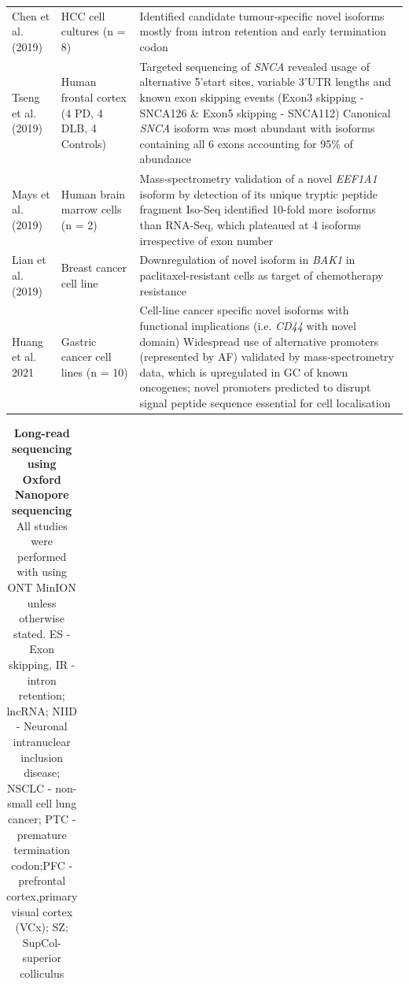 \begin{changemargin}{1.5cm}
\begin{landscape}
\begin{longtable}[c]{p{4cm}p{4cm}p{18cm}}
			\centering Chen et al. (2019) \cite{Chen2019} &
			\centering HCC cell cultures (n = 8)  &
			\tabitem Identified candidate tumour-specific novel isoforms mostly from intron retention and early termination codon\\
			\hdashline[0.5pt/5pt]
			
			\centering Tseng et al. (2019) \cite{Tseng2019} &
			\centering Human frontal cortex \newline (4 PD, 4 DLB, 4 Controls)  &
			\tabitem Targeted sequencing of \textit{SNCA} revealed usage of alternative 5'start sites, variable 3'UTR lengths and known exon skipping events (Exon3 skipping - SNCA126 \& Exon5 skipping - SNCA112) \newline 
			\tabitem Canonical \textit{SNCA} isoform was most abundant with isoforms containing all 6 exons accounting for 95\% of abundance\\
			\hdashline[0.5pt/5pt]
			
			\centering Mays et al. (2019)\cite{DeslattesMays2019} &
			\centering Human brain marrow cells (n = 2)  &
			\tabitem  Mass-spectrometry validation of a novel \textit{EEF1A1} isoform by detection of its unique tryptic peptide fragment \newline 
			\tabitem Iso-Seq identified 10-fold more isoforms than RNA-Seq, which plateaued at 4 isoforms irrespective of exon number \\
			\hdashline[0.5pt/5pt]
			
			\centering Lian et al. (2019) \cite{Lian2019} &
			\centering Breast cancer cell line &
			\tabitem Downregulation of novel isoform in \textit{BAK1} in paclitaxel-resistant cells as target of chemotherapy resistance \\
			\hdashline[0.5pt/5pt]
			
			\centering Huang et al. 2021 \cite{Huang2021} &
			\centering Gastric cancer cell lines (n = 10) &
			\tabitem Cell-line cancer specific novel isoforms with functional implications (i.e. \textit{CD44} with novel domain) \newline
			\tabitem Widespread use of alternative promoters (represented by AF) validated by mass-spectrometry data, which is upregulated in GC of known oncogenes; novel promoters predicted to disrupt signal peptide sequence essential for cell localisation   \\* \bottomrule
		\end{longtable}
		
		\begin{longtable}[c]{p{4cm}p{4cm}p{18cm}}
			\caption[Long-read sequencing using Oxford Nanopore sequencing]%
			{\textbf{Long-read sequencing using Oxford Nanopore sequencing} All studies were performed with using ONT MinION unless otherwise stated. ES - Exon skipping, IR - intron retention; lncRNA; NIID - Neuronal intranuclear inclusion disease; NSCLC - non-small cell lung cancer; PTC - premature termination codon;PFC - prefrontal cortex,primary visual cortex (VCx); SZ; SupCol- superior colliculus }
			\label{tab: longread_ontstudies}\\
			

\end{longtable}
\end{landscape}
\end{changemargin}
